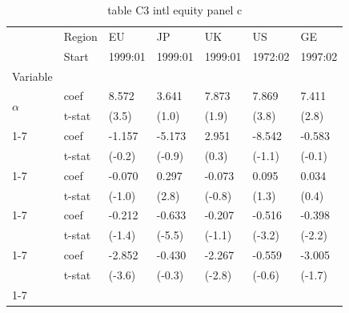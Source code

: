 \begin{table}[htbp]
  \centering
  \caption{table C3 intl equity panel c}
  \label{tab:table_C3_intl_equity_panel_c}
  \begin{tabular}{lllllll}
\toprule
 & Region & EU & JP & UK & US & GE \\
 & Start & 1999:01 & 1999:01 & 1999:01 & 1972:02 & 1997:02 \\
Variable &  &  &  &  &  &  \\
\midrule
\multirow[t]{2}{*}{$\alpha$} & coef & 8.572 & 3.641 & 7.873 & 7.869 & 7.411 \\
 & t-stat & (3.5) & (1.0) & (1.9) & (3.8) & (2.8) \\
\cline{1-7}
\multirow[t]{2}{*}{$I_B$} & coef & -1.157 & -5.173 & 2.951 & -8.542 & -0.583 \\
 & t-stat & (-0.2) & (-0.9) & (0.3) & (-1.1) & (-0.1) \\
\cline{1-7}
\multirow[t]{2}{*}{$R^e_m$} & coef & -0.070 & 0.297 & -0.073 & 0.095 & 0.034 \\
 & t-stat & (-1.0) & (2.8) & (-0.8) & (1.3) & (0.4) \\
\cline{1-7}
\multirow[t]{2}{*}{$I_B R^e_m$} & coef & -0.212 & -0.633 & -0.207 & -0.516 & -0.398 \\
 & t-stat & (-1.4) & (-5.5) & (-1.1) & (-3.2) & (-2.2) \\
\cline{1-7}
\multirow[t]{2}{*}{$\hat{\sigma}^2_m R^e_m$} & coef & -2.852 & -0.430 & -2.267 & -0.559 & -3.005 \\
 & t-stat & (-3.6) & (-0.3) & (-2.8) & (-0.6) & (-1.7) \\
\cline{1-7}
\bottomrule
\end{tabular}

\end{table}
